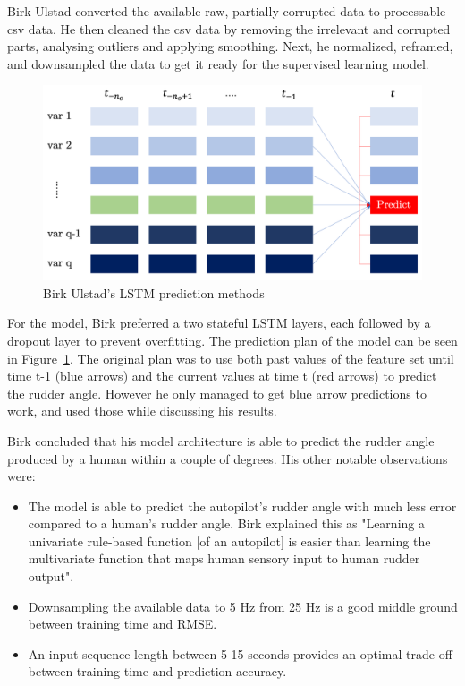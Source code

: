 \documentclass[12pt,twoside]{report}
\begin{document}
Birk Ulstad converted the available raw, partially corrupted data to processable csv data. He then cleaned the csv data by removing the irrelevant and corrupted parts, analysing outliers and applying smoothing. Next, he normalized, reframed, and downsampled the data to get it ready for the supervised learning model.

\begin{figure}[h]
\centering
\includegraphics[width = 0.7\hsize]{figures/Birk Ulstad LSTM prediction.png}
\caption{Birk Ulstad's LSTM prediction methods \cite{birk}}
\label{fig:birk lstm}
\end{figure}

For the model, Birk preferred a two stateful LSTM layers, each followed by a dropout layer to prevent overfitting. The prediction plan of the model can be seen in Figure~\ref{fig:birk lstm}. The original plan was to use both past values of the feature set until time t-1 (blue arrows) and the current values at time t (red arrows) to predict the rudder angle. However he only managed to get blue arrow predictions to work, and used those while discussing his results.

Birk concluded that his model architecture is able to predict the rudder angle produced by a human within a couple of degrees. His other notable observations were: 
\begin{itemize}
  \item The model is able to predict the autopilot's rudder angle with much less error compared to a human's rudder angle. Birk explained this as "Learning a univariate rule-based function [of an autopilot] is easier than learning the multivariate function that maps human sensory input to human rudder output".
  \item Downsampling the available data to 5 Hz from 25 Hz is a good middle ground between training time and RMSE. 
  \item An input sequence length between 5-15 seconds provides an optimal trade-off between training time and prediction accuracy.
\end{itemize} 
\end{document}
